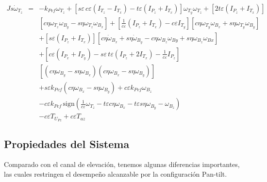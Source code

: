 \begin{equation}
\begin{array}{rcl}
Js\dot{\omega}_{T_z} & = & -k_{Pvf} \omega_{T_z} +\left[s\varepsilon \, c\varepsilon\left(I_{T_z} -I_{T_x} \right) - t\varepsilon \left(I_{P_z} +I_{T_x} \right) \right]\omega_{T_y}\omega_{T_z} + \left[ 2t\varepsilon \left(I_{P_z} +I_{T_x} \right) \right] \\

 & & \left[c\eta \omega_{T_z}\omega_{B_y} - s\eta \omega_{T_z}\omega_{B_x}\right] +\left[ \frac{1}{c\varepsilon} \left(I_{P_z} +I_{T_x} \right)- c\varepsilon I_{T_y} \right] \left[ c\eta \omega_{T_y}\omega_{B_x} + s\eta \omega_{T_y}\omega_{B_y}\right]\\ 

 & & + \left[s\varepsilon \left(I_{P_z} +I_{T_x} \right)\right]\left[ c\eta\dot{\omega}_{B_x} + s\eta\dot{\omega}_{B_y}- c\eta\omega_{B_z}\omega_{By} + s\eta\omega_{B_z}\omega_{Bx}\right]\\
 
 & & +\left[c\varepsilon \left(I_{P_x} +I_{P_y} \right)- s\varepsilon \, t\varepsilon \left(I_{P_z} +2I_{T_x} \right)-\frac{1}{c\varepsilon}I_{P_z} \right]\\ 
 
 & &  \left[\left(c\eta \omega_{B_y}-s\eta \omega_{B_x}\right)\left(c\eta \omega_{B_x}-s\eta \omega_{B_y}\right)\right]\\ 
 
 & & + s\varepsilon k_{Pvf}\left(c\eta \omega_{B_x}-s\eta \omega_{B_y}\right) + c\varepsilon k_{Pvf}\omega_{B_z}\\ 
 
 & & - c\varepsilon k_{Pcf} \, \mathrm{sign}\left( \frac{1}{c\varepsilon} \omega_{T_z} - t\varepsilon c\eta \omega_{B_x}-t\varepsilon s\eta \omega_{B_y} - \omega_{B_z}\right)\\ 
 
 & & - c\varepsilon T_{U_{Pz}} +c\varepsilon T_{az}
 
\end{array}
\label{CrossEl}
\end{equation}

\subsection{Propiedades del Sistema}\label{sec:propiedadessist}

Comparado con el canal de elevaci\'{o}n, tenemos algunas diferencias importantes, las cuales restringen el desempe\~{n}o alcanzable por la configuraci\'{o}n Pan-tilt.

